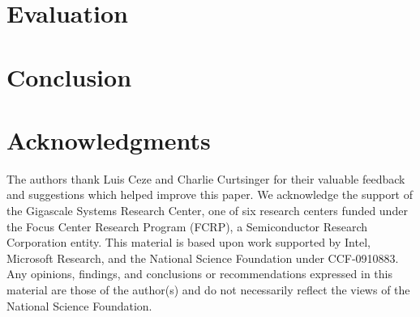 \documentclass[10pt,preprint]{sigplanconf} %
\begin{document}
\section{Evaluation}


%

\section{Conclusion}


\section{Acknowledgments}
The authors thank Luis Ceze and Charlie Curtsinger for their valuable
feedback and suggestions which helped improve this paper. We
acknowledge the support of the Gigascale Systems Research Center, one
of six research centers funded under the Focus Center Research Program
(FCRP), a Semiconductor Research Corporation entity.  This material is
based upon work supported by Intel, Microsoft Research, and the
National Science Foundation under CCF-0910883. Any opinions, findings,
and conclusions or recommendations expressed in this material are
those of the author(s) and do not necessarily reflect the views of the
National Science Foundation.


{


}
\end{document}
